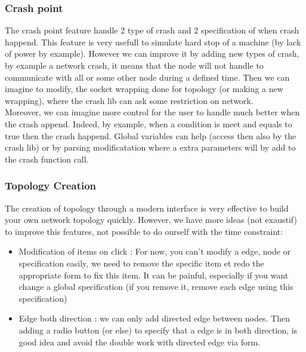 \documentclass{eplmastersthesis}
\begin{document}
        \subsubsection{Crash point}

          The crash point feature handle 2 type of crash and 2 specification of when crash happend.
          This feature is very usefull to simulate hard stop of a machine (by lack of power by example).
          However we can improve it by adding new types of crash, by example a network crash, it means
          that the node will not handle to communicate with all or some other node during a defined time.
          Then we can imagine to modify, the socket wrapping done for topology (or making a new wrapping),
          where the crash lib can ask some restriction on network. \\

          Moreover, we can imagine more control for the user to handle much better when the crash append.
          Indeed, by example, when a condition is meet and equals to true then the crash happend.
          Global variables can help (access then also by the crash lib) or by parsing modificatation
          where a extra parameters will by add to the crash function call.\\

        \subsubsection{Topology Creation}

          The creation of topology through a modern interface is very effective to build your own
          network topology quickly. However, we have more ideas (not exaustif) to improve this features, not possible to do ourself
          with the time constraint:
          \begin{itemize}
            \item Modification of items on click : For now, you can't modify a edge, node or specification
            easily, we need to remove the specific item et redo the appropriate form to fix this item. It can
            be painful, especially if you want change a global specification (if you remove it, remove each edge using this specification)
            \item Edge both direction : we can only add directed edge between nodes.
            Then adding a radio button (or else) to specify that a edge is in both direction, is good idea and avoid
            the double work with directed edge via form.
          \end{itemize}
\end{document}
